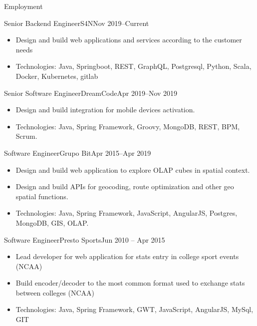 \documentclass[]{mcdowellcv}
\begin{document}
	\makeheader
	
	\begin{cvsection}{Employment}
		\begin{cvsubsection}{Senior Backend Engineer}{S4N}{Nov 2019--Current}
			\begin{itemize}
				\item Design and build web applications and services according to the customer needs 						
				\item Technologies: Java, Springboot, REST, GraphQL, Postgresql, Python, Scala, Docker, Kubernetes, gitlab		 			
			\end{itemize}
		\end{cvsubsection}
	
		\begin{cvsubsection}{Senior Software Engineer}{DreamCode}{Apr 2019--Nov 2019}
			\begin{itemize}
				\item Design and build integration for mobile devices activation.							
				\item Technologies: Java, Spring Framework, Groovy, MongoDB, REST, BPM, Scrum.		 			
			\end{itemize}
		\end{cvsubsection}

		\begin{cvsubsection}{Software Engineer}{Grupo Bit}{Apr 2015--Apr 2019}
			\begin{itemize}
				\item Design and build web application to explore OLAP cubes in spatial context.
				\item Design and build APIs for geocoding, route optimization and other geo spatial functions.
				\item Technologies: Java, Spring Framework, JavaScript, AngularJS, Postgres, MongoDB, GIS, OLAP.		 			
			\end{itemize}
		\end{cvsubsection}
		
		\begin{cvsubsection}{Software Engineer}{Presto Sports}{Jun 2010 -- Apr 2015}						
			\begin{itemize}
				\item Lead developer for web application for stats entry in college sport events (NCAA)
				\item Build encoder/decoder to the most common format used to exchange stats between colleges (NCAA)
				\item Technologies: Java, Spring Framework, GWT, JavaScript, AngularJS, MySql, GIT	
				

\end{itemize}
\end{cvsubsection}
\end{cvsection}
\end{document}
